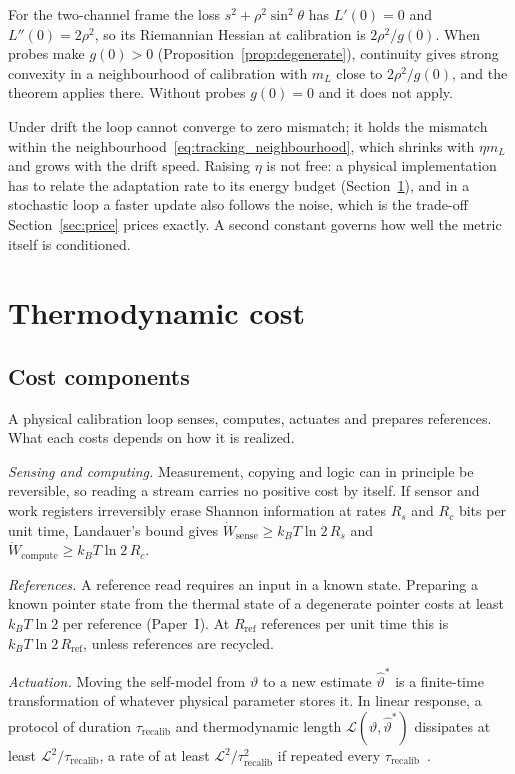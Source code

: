 \documentclass[12pt]{article}
\theoremstyle{definition}
\begin{document}
For the two-channel frame the loss $s^2+\rho^2\sin^2\theta$ has $L'(0)=0$ and $L''(0)=2\rho^2$, so its Riemannian Hessian at calibration is $2\rho^2/g(0)$. When probes make $g(0)>0$ (Proposition~\ref{prop:degenerate}), continuity gives strong convexity in a neighbourhood of calibration with $m_L$ close to $2\rho^2/g(0)$, and the theorem applies there. Without probes $g(0)=0$ and it does not apply.

Under drift the loop cannot converge to zero mismatch; it holds the mismatch within the neighbourhood~\eqref{eq:tracking_neighbourhood}, which shrinks with $\eta m_L$ and grows with the drift speed. Raising $\eta$ is not free: a physical implementation has to relate the adaptation rate to its energy budget (Section~\ref{sec:cost}), and in a stochastic loop a faster update also follows the noise, which is the trade-off Section~\ref{sec:price} prices exactly. A second constant governs how well the metric itself is conditioned.


\section{Thermodynamic cost}
\label{sec:cost}

\subsection{Cost components}
\label{subsec:cost_components}

A physical calibration loop senses, computes, actuates and prepares references. What each costs depends on how it is realized.

\emph{Sensing and computing.} Measurement, copying and logic can in principle be reversible, so reading a stream carries no positive cost by itself. If sensor and work registers irreversibly erase Shannon information at rates $R_s$ and $R_c$ bits per unit time, Landauer's bound gives $\dot W_{\mathrm{sense}}\ge k_BT\ln2\,R_s$ and $\dot W_{\mathrm{compute}}\ge k_BT\ln2\,R_c$.

\emph{References.} A reference read requires an input in a known state. Preparing a known pointer state from the thermal state of a degenerate pointer costs at least $k_BT\ln2$ per reference (Paper~I). At $R_{\mathrm{ref}}$ references per unit time this is $k_BT\ln2\,R_{\mathrm{ref}}$, unless references are recycled.

\emph{Actuation.} Moving the self-model from $\vartheta$ to a new estimate $\hat\vartheta^*$ is a finite-time transformation of whatever physical parameter stores it. In linear response, a protocol of duration $\tau_{\mathrm{recalib}}$ and thermodynamic length $\mathcal L(\vartheta,\hat\vartheta^*)$ dissipates at least $\mathcal L^2/\tau_{\mathrm{recalib}}$, a rate of at least $\mathcal L^2/\tau_{\mathrm{recalib}}^2$ if repeated every $\tau_{\mathrm{recalib}}$~\cite{SivakCrooks2012}.
\end{document}
